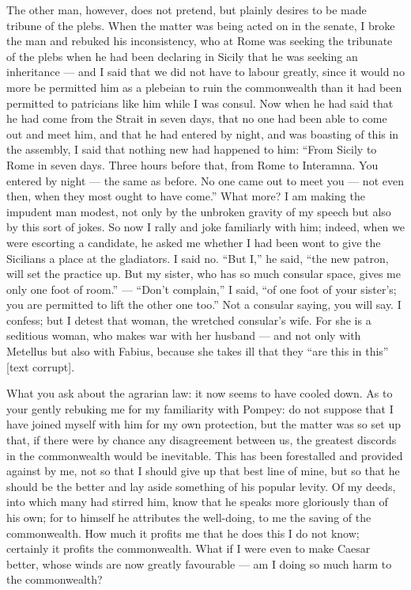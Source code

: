  The other man, however, does not pretend, but plainly desires to be made tribune of the plebs. When the matter was being acted on in the senate, I broke the man and rebuked his inconsistency, who at Rome was seeking the tribunate of the plebs when he had been declaring in Sicily that he was seeking an inheritance --- and I said that we did not have to labour greatly, since it would no more be permitted him as a plebeian to ruin the commonwealth than it had been permitted to patricians like him while I was consul. Now when he had said that he had come from the Strait in seven days, that no one had been able to come out and meet him, and that he had entered by night, and was boasting of this in the assembly, I said that nothing new had happened to him: ``From Sicily to Rome in seven days. Three hours before that, from Rome to Interamna. You entered by night --- the same as before. No one came out to meet you --- not even then, when they most ought to have come.'' What more? I am making the impudent man modest, not only by the unbroken gravity of my speech but also by this sort of jokes. So now I rally and joke familiarly with him; indeed, when we were escorting a candidate, he asked me whether I had been wont to give the Sicilians a place at the gladiators. I said no. ``But I,'' he said, ``the new patron, will set the practice up. But my sister, who has so much consular space, gives me only one foot of room.'' --- ``Don't complain,'' I said, ``of one foot of your sister's; you are permitted to lift the other one too.'' Not a consular saying, you will say. I confess; but I detest that woman, the wretched consular's wife. For she is a seditious woman, who makes war with her husband --- and not only with Metellus but also with Fabius, because she takes ill that they ``are this in this'' [text corrupt].

 What you ask about the agrarian law: it now seems to have cooled down. As to your gently rebuking me for my familiarity with Pompey: do not suppose that I have joined myself with him for my own protection, but the matter was so set up that, if there were by chance any disagreement between us, the greatest discords in the commonwealth would be inevitable. This has been forestalled and provided against by me, not so that I should give up that best line of mine, but so that he should be the better and lay aside something of his popular levity. Of my deeds, into which many had stirred him, know that he speaks more gloriously than of his own; for to himself he attributes the well-doing, to me the saving of the commonwealth. How much it profits me that he does this I do not know; certainly it profits the commonwealth. What if I were even to make Caesar better, whose winds are now greatly favourable --- am I doing so much harm to the commonwealth?

